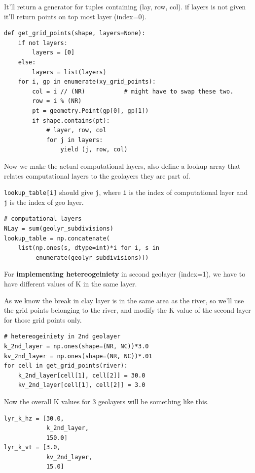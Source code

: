 \documentclass[titlepage,12pt]{unisubmission}
\begin{document}
It'll return a generator for tuples containing (lay, row, col). if layers is not given it'll return points on top most layer (index=0).

\begin{verbatim}
def get_grid_points(shape, layers=None):
    if not layers:
        layers = [0]
    else:
        layers = list(layers)
    for i, gp in enumerate(xy_grid_points):
        col = i // (NR)           # might have to swap these two.
        row = i % (NR)
        pt = geometry.Point(gp[0], gp[1])
        if shape.contains(pt):
            # layer, row, col
            for j in layers:
                yield (j, row, col)
\end{verbatim}


Now we make the actual computational layers, also define a lookup array that relates computational layers to the geolayers they are part of.

\texttt{lookup\_table[i]} should give \texttt{j}, where \texttt{i} is the index of computational layer and \texttt{j} is the index of geo layer.

\begin{verbatim}
# computational layers
NLay = sum(geolyr_subdivisions)
lookup_table = np.concatenate(
    list(np.ones(s, dtype=int)*i for i, s in
         enumerate(geolyr_subdivisions)))
\end{verbatim}

For \textbf{implementing hetereogeiniety} in second geolayer  (index=1), we have to have different values of K in the same layer.

As we know the break in clay layer is in the same area as the river, so we'll use the grid points belonging to the river, and modify the K value of the second layer for those grid points only.

\begin{verbatim}
# hetereogeiniety in 2nd geolayer
k_2nd_layer = np.ones(shape=(NR, NC))*3.0
kv_2nd_layer = np.ones(shape=(NR, NC))*.01
for cell in get_grid_points(river):
    k_2nd_layer[cell[1], cell[2]] = 30.0
    kv_2nd_layer[cell[1], cell[2]] = 3.0
\end{verbatim}

Now the overall K values for 3 geolayers will be something like this.
\begin{verbatim}
lyr_k_hz = [30.0,
            k_2nd_layer,
            150.0]
lyr_k_vt = [3.0,
            kv_2nd_layer,
            15.0]
\end{verbatim}
\end{document}

